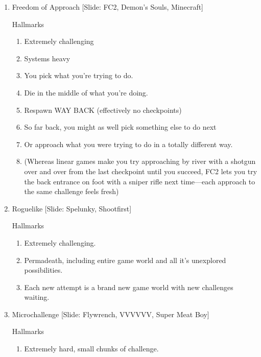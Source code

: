 \documentclass[12pt]{article}
\begin{document}
{\begin{enumerate}
\item Freedom of Approach  [Slide: FC2, Demon's Souls, Minecraft]

Hallmarks
\begin{enumerate}
  \item Extremely challenging
  
  \item Systems heavy

  \item You pick what you're trying to do.
   
  \item Die in the middle of what you're doing.

  \item Respawn WAY BACK (effectively no checkpoints)

  \item So far back, you might as well pick something else to do next

  \item Or approach what you were trying to do in a totally different way.

  \item (Whereas linear games make you try approaching by river with a shotgun over and over from the last checkpoint until you succeed, FC2 lets you try the back entrance on foot with a sniper rifle next time---each approach to the same challenge feels fresh)
\end{enumerate}




\item Roguelike [Slide: Spelunky, Shootfirst]

Hallmarks
\begin{enumerate}
  \item Extremely challenging.

  \item Permadeath, including entire game world and all it's unexplored possibilities.

  \item Each new attempt is a brand new game world with new challenges waiting.
\end{enumerate}





\item Microchallenge [Slide: Flywrench, VVVVVV, Super Meat Boy]

Hallmarks
\begin{enumerate}
  \item Extremely hard, small chunks of challenge.


\end{enumerate}
\end{enumerate}}
\end{document}
